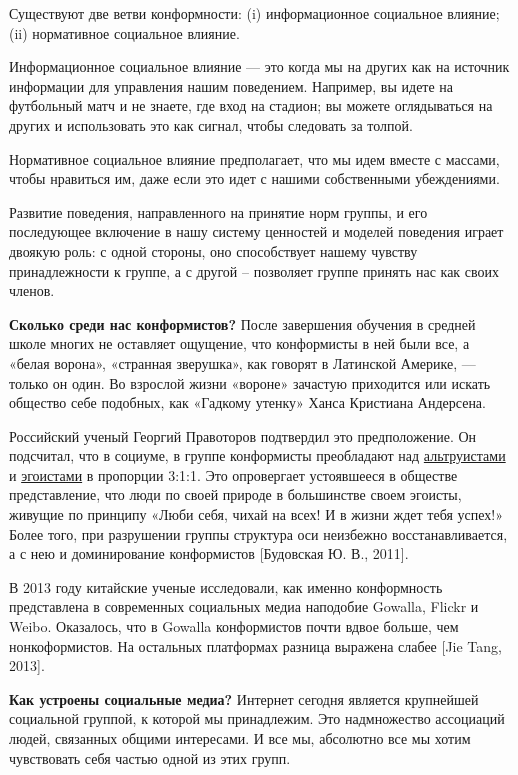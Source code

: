 Существуют две ветви конформности: (i) информационное социальное влияние; (ii) нормативное социальное влияние.

Информационное социальное влияние --- это когда мы  на других как на источник информации для управления нашим поведением. Например, вы идете на футбольный матч и не знаете, где вход на стадион; вы можете оглядываться на других и использовать это как сигнал, чтобы следовать за толпой.

Нормативное социальное влияние предполагает, что мы идем вместе с массами, чтобы нравиться им, даже если это идет  с нашими собственными убеждениями.

Развитие поведения, направленного на принятие норм группы, и его последующее включение в нашу систему ценностей и моделей поведения играет двоякую роль: с одной стороны, оно способствует нашему чувству принадлежности к группе, а с другой – позволяет группе принять нас как своих членов.

\textbf{Сколько среди нас конформистов?}
После завершения обучения в средней школе многих не оставляет ощущение, что конформисты в ней были все, а «белая ворона», «странная зверушка», как говорят в Латинской Америке, --- только он один. Во взрослой жизни «вороне» зачастую приходится  или искать общество себе подобных, как «Гадкому утенку» Ханса Кристиана Андерсена.

Российский ученый Георгий Правоторов подтвердил это предположение. Он подсчитал, что в социуме, в группе конформисты преобладают над \href{https://4brain.ru/blog/altruism/}{альтруистами} и \href{https://4brain.ru/blog/egoizm-chto-eto-i-kak-s-nim-zhit/}{эгоистами} в пропорции 3:1:1. Это опровергает устоявшееся в обществе представление, что люди по своей природе в большинстве своем эгоисты, живущие по принципу «Люби себя, чихай на всех! И в жизни ждет тебя успех!» Более того, при разрушении группы структура оси неизбежно восстанавливается, а с нею и доминирование конформистов [Будовская Ю. В., 2011].

В 2013 году китайские ученые исследовали, как именно конформность представлена в современных социальных медиа наподобие Gowalla, Flickr и Weibo. Оказалось, что в Gowalla конформистов почти вдвое больше, чем нонкоформистов. На остальных платформах разница выражена слабее [Jie Tang, 2013].


\textbf{Как устроены социальные медиа?}
Интернет сегодня является крупнейшей социальной группой, к которой мы принадлежим. Это надмножество ассоциаций людей, связанных общими интересами. И все мы, абсолютно все мы хотим чувствовать себя частью одной из этих групп.

